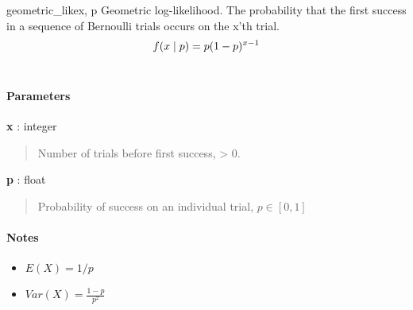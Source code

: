 \hypertarget{pymc.distributions.geometric_like}{}
\begin{funcdesc}{geometric\_like}{x, p}
Geometric log-likelihood. The probability that the first success in a
sequence of Bernoulli trials occurs on the x'th trial.
\begin{gather}
\begin{split}f(x \mid p) = p(1-p)^{x-1}\end{split}\notag\\\begin{split}\end{split}\notag
\end{gather}
\paragraph{Parameters}
\begin{paramlist}
\item[] \textbf{x} : integer
\begin{quote}

Number of trials before first success, \textgreater{} 0.
\end{quote}

\item[] \textbf{p} : float
\begin{quote}

Probability of success on an individual trial, $p \in [0,1]$
\end{quote}
\end{paramlist}
\paragraph{Notes}
\begin{itemize}
\item {} 
$E(X)=1/p$

\item {} 
$Var(X)=\frac{1-p}{p^2}$

\end{itemize}
\end{funcdesc}

